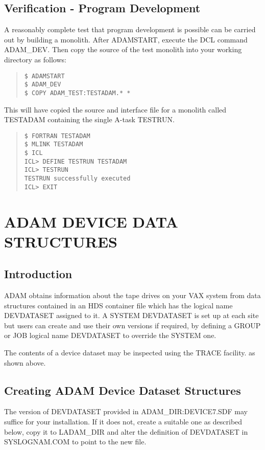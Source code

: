 \subsection{Verification - Program Development}
A reasonably complete test that program development is possible can be 
carried out by building a monolith.
After ADAMSTART, execute the DCL command ADAM\_DEV. Then copy the source 
of the test monolith into your working directory as follows:
\small \begin{quote}
\begin{verbatim}
$ ADAMSTART
$ ADAM_DEV
$ COPY ADAM_TEST:TESTADAM.* *
\end{verbatim}
\end{quote} \normalsize
This will have copied the source and interface file for a monolith 
called TESTADAM containing the single A-task TESTRUN.
\small \begin{quote}
\begin{verbatim}
$ FORTRAN TESTADAM
$ MLINK TESTADAM
$ ICL
ICL> DEFINE TESTRUN TESTADAM
ICL> TESTRUN
TESTRUN successfully executed
ICL> EXIT
\end{verbatim}
\end{quote} \normalsize

\section{ADAM DEVICE DATA STRUCTURES}
\label{devdataset}
\subsection{Introduction}
ADAM obtains information about the tape drives on your VAX system from data 
structures contained in an HDS container file which has the logical name 
DEVDATASET assigned to it.
A SYSTEM DEVDATASET is set up at each site but users can create
and use their own versions if required, by defining a GROUP or JOB logical
name DEVDATASET to override the SYSTEM one.

The contents of a device dataset may be inspected using the TRACE facility.
as shown above.

\subsection{Creating ADAM Device Dataset Structures}
The version of DEVDATASET provided in ADAM\_DIR:DEVICE7.SDF may suffice for
your installation. If it does not, create a suitable one as described 
below, copy it to LADAM\_DIR and alter the definition of DEVDATASET in 
SYSLOGNAM.COM to point to the new file.

